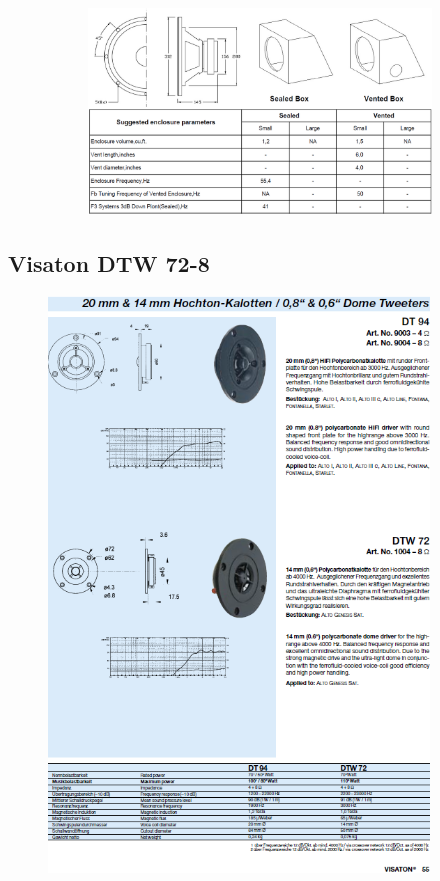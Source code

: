 \begin{figure}
	\begin{figure} [H]
		\centering
		\includegraphics[width=1\textwidth]{img/LSMessung/TT/Renkforce-Datasheet2.png}
	\end{figure}
\end{figure}

\subsection{Visaton DTW 72-8}\label{sec:8.8}
\begin{figure} [H]	
	\centering
	\includegraphics[width=0.9\textwidth]{form/VIS_DTW72.PNG}
\end{figure}




